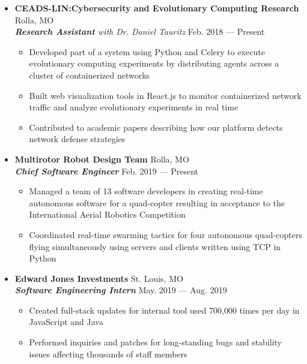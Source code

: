\documentclass[9pt,oneside]{memoir}
\begin{document}
\begin{itemize}
    \item[] \textbf{CEADS-LIN:\@ Cybersecurity and Evolutionary Computing Research}
    \hfill Rolla, MO\\
    \textit{\textbf{Research Assistant} with Dr. Daniel Tauritz}
    \hfill Feb. 2018 --- Present
    \begin{itemize}
      \item[\textbullet] Developed part of a system using Python and Celery to execute
      evolutionary computing experiments by distributing agents across a cluster
      of containerized networks
      \item[\textbullet] Built web visualization tools in React.js to
      monitor containerized network traffic and analyze evolutionary experiments
      in real time
      \item[\textbullet] Contributed to academic papers describing how our
      platform detects network defense strategies
    \end{itemize}

  \item[] \textbf{Multirotor Robot Design Team}
      \hfill Rolla, MO\\
      \textit{\textbf{Chief Software Engineer}}
      \hfill Feb. 2019 --- Present
      \begin{itemize}
          \item[\textbullet] Managed a team of 13 software developers in
          creating real-time autonomous software for a quad-copter resulting in
          acceptance to the International Aerial Robotics Competition
          \item[\textbullet] Coordinated real-time swarming tactics for four
          autonomous quad-copters flying simultaneously using servers and clients
          written using TCP in Python
      \end{itemize}

  \item[] \textbf{Edward Jones Investments}
      \hfill St. Louis, MO\\
      \textit{\textbf{Software Engineering Intern}}
      \hfill May. 2019 --- Aug. 2019
      \begin{itemize}
          \item[\textbullet] Created full-stack updates for internal tool used 700,000 times per day in JavaScript and Java
          \item[\textbullet] Performed inquiries and patches for long-standing bugs and stability issues affecting thousands of staff members
      \end{itemize}


\end{itemize}
\end{document}
